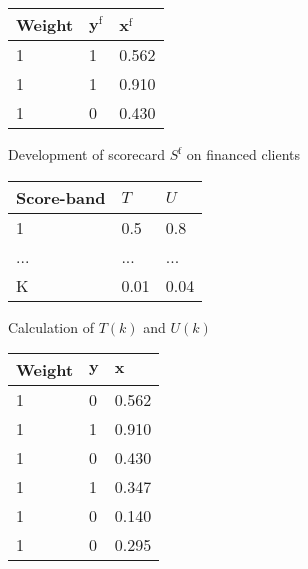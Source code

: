 \begin{figure}
{\setlength{\parindent}{0cm}
\begin{multicols}{3}

\begin{subfigure}[t]{0.31\textwidth}
\begin{center}
\begin{adjustbox}{max width=\textwidth}
\begin{tabular}{l l l}
\toprule
\textbf{Weight} & \textbf{${\bm{y}}^{\text{f}}$} & \textbf{${\bm{x}}^{\text{f}}$}\\
\midrule
1 & 1 & 0.562 \\
1 & 1 & 0.910 \\
1 & 0 & 0.430 \\
\bottomrule
\end{tabular}
\end{adjustbox}
\end{center}

\caption{Development of scorecard $S^{\text{f}}$ on financed clients}
\label{parcel:sfig1}
\end{subfigure}

\columnbreak

\begin{subfigure}[t]{0.31\textwidth}
\begin{center}
\begin{adjustbox}{max width=\textwidth}
\begin{tabular}{l l l}
\toprule
\textbf{Score-band} & \textbf{$T$} &  \textbf{$U$} \\
\midrule
1 & 0.5 & 0.8 \\
... & ... & ... \\
K & 0.01 & 0.04 \\
\bottomrule
\end{tabular}
\end{adjustbox}
\end{center}

\caption{Calculation of $T(k)$ and $U(k)$}
\label{parcel:sfig2}
\end{subfigure}

\columnbreak

\begin{subfigure}[t]{0.31\textwidth}
\begin{center}
\begin{adjustbox}{max width=\textwidth}
\begin{tabular}{l l l}
\toprule
\textbf{Weight} & \textbf{${\bm{y}}$} & \textbf{${\bm{x}}$}\\
\midrule
1 & 0 & 0.562 \\
1 & 1 & 0.910 \\
1 & 0 & 0.430 \\
1 & 1 & 0.347 \\
1 & 0 & 0.140 \\
1 & 0 & 0.295 \\
\bottomrule
\end{tabular}
\end{adjustbox}
\end{center}


\end{subfigure}
\end{multicols}}
\end{figure}
